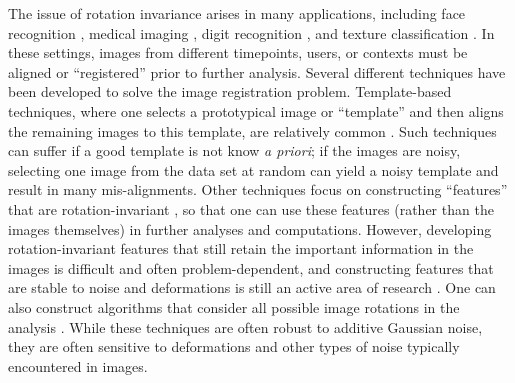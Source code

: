 \documentclass[10pt]{article}
\begin{document}
The issue of rotation invariance arises in many applications, including face recognition \cite{rowley1998rotation}, medical imaging \cite{hajnal2010medical}, digit recognition \cite{simard1992efficient}, and texture classification \cite{greenspan1994rotation}.
%
In these settings, images from different timepoints, users, or contexts must be aligned or ``registered'' prior to further analysis.
%
%
%
Several different techniques have been developed to solve the image registration problem. 
%
Template-based techniques, where one selects a prototypical image or ``template'' and then aligns the remaining images to this template, are relatively common \cite{ahuja2007template}.
%
Such techniques can suffer if a good template is not know {\em a priori}; if the images are noisy, selecting one image from the data set at random can yield a noisy template and result in many mis-alignments. 
%
Other techniques focus on constructing ``features'' that are rotation-invariant \cite{flusser2000independence, lowe1999object, sadler1992shift, ojala2002multiresolution}, so that one can use these features (rather than the images themselves) in further analyses and computations.
%
However, developing rotation-invariant features that still retain the important information in the images is difficult and often problem-dependent, and constructing features that are stable to noise and deformations is still an active area of research \cite{mallat2012group, sifre2013rotation}.
%
One can also construct algorithms that consider all possible image rotations in the analysis \cite{hilai1994recognition, zhao2013fourier}.
%
While these techniques are often robust to additive Gaussian noise, they are often sensitive to deformations and other types of noise typically encountered in images.
\end{document}
